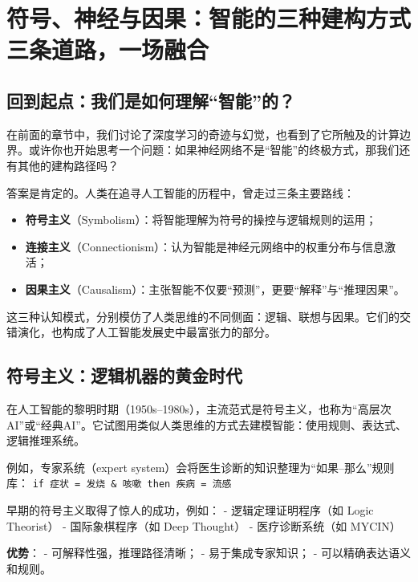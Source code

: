 

\chapter{符号、神经与因果：智能的三种建构方式 \texorpdfstring{\\}{ } 三条道路，一场融合}

\section*{回到起点：我们是如何理解“智能”的？}

在前面的章节中，我们讨论了深度学习的奇迹与幻觉，也看到了它所触及的计算边界。或许你也开始思考一个问题：如果神经网络不是“智能”的终极方式，那我们还有其他的建构路径吗？

答案是肯定的。人类在追寻人工智能的历程中，曾走过三条主要路线：

\begin{itemize}
\item \textbf{符号主义}（Symbolism）：将智能理解为符号的操控与逻辑规则的运用；
\item \textbf{连接主义}（Connectionism）：认为智能是神经元网络中的权重分布与信息激活；
\item \textbf{因果主义}（Causalism）：主张智能不仅要“预测”，更要“解释”与“推理因果”。
\end{itemize}

这三种认知模式，分别模仿了人类思维的不同侧面：逻辑、联想与因果。它们的交错演化，也构成了人工智能发展史中最富张力的部分。

\section*{符号主义：逻辑机器的黄金时代}

在人工智能的黎明时期（1950s–1980s），主流范式是符号主义，也称为“高层次AI”或“经典AI”。它试图用类似人类思维的方式去建模智能：使用规则、表达式、逻辑推理系统。

例如，专家系统（expert system）会将医生诊断的知识整理为“如果–那么”规则库：  
\texttt{if 症状 = 发烧 \& 咳嗽 then 疾病 = 流感}

早期的符号主义取得了惊人的成功，例如：
- 逻辑定理证明程序（如 Logic Theorist）
- 国际象棋程序（如 Deep Thought）
- 医疗诊断系统（如 MYCIN）

\textbf{优势}：
- 可解释性强，推理路径清晰；
- 易于集成专家知识；
- 可以精确表达语义和规则。

